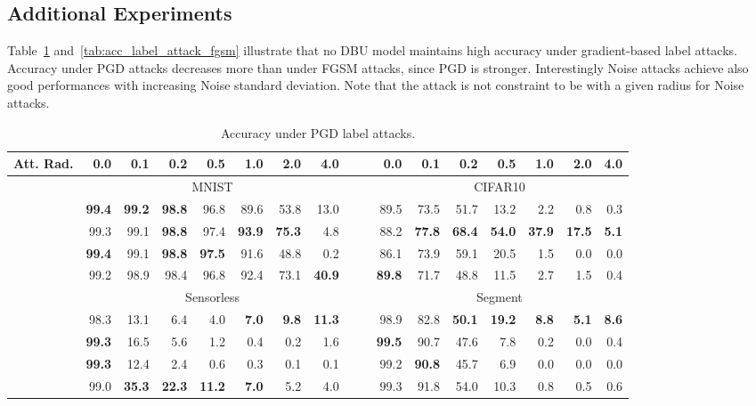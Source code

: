 \newpage 
\subsection{Additional Experiments}



Table~\ref{tab:acc_label_attack} and~\ref{tab:acc_label_attack_fgsm} illustrate that no DBU model maintains high accuracy under gradient-based label attacks. Accuracy under PGD attacks decreases more than under FGSM attacks, since PGD is stronger.  Interestingly Noise attacks achieve also good performances with increasing Noise standard deviation. Note that the attack is not constraint to be with a given radius for Noise attacks.



\begin{table}[htbp!]
 	\centering
 	\caption{Accuracy under PGD label attacks.}
 	\begin{small}
 		\begin{tabular}{@{}rrrrrrrrc|crrrrrrr@{}}
 			\toprule
  			Att. Rad. & 0.0 & 0.1 & 0.2 & 0.5 & 1.0 & 2.0 & 4.0 & & & 0.0 & 0.1 & 0.2 & 0.5 & 1.0 & 2.0 & 4.0 \\
 			\midrule
 			& \multicolumn{7}{c}{MNIST} & & & \multicolumn{7}{c}{CIFAR10} \\
 			\PostNet  &  \bf{99.4} &  \bf{99.2} &  \bf{98.8} &  96.8 &  89.6 &  53.8 &  13.0 & &
 			          &  89.5 &  73.5 &  51.7 &  13.2 &   2.2 &   0.8 &  0.3 \\
 			\PriorNet &  99.3 &  99.1 &  \bf{98.8} &  97.4 &  \bf{93.9} &  \bf{75.3} &   4.8 & &
 			          &  88.2 &  \bf{77.8} &  \bf{68.4} &  \bf{54.0} &  \bf{37.9} &  \bf{17.5} &  \bf{5.1} \\
 		    \DDNet    &  \bf{99.4} &  99.1 &  \bf{98.8} &  \bf{97.5} &  91.6 &  48.8 &   0.2 & &
 		              &  86.1 &  73.9 &  59.1 &  20.5 &   1.5 &   0.0 &  0.0 \\
 		    \EvNet    &  99.2 &  98.9 &  98.4 &  96.8 &  92.4 &  73.1 &  \bf{40.9} & &
 		              &  \bf{89.8} &  71.7 &  48.8 &  11.5 &   2.7 &   1.5 &  0.4 \\
 		    \midrule
 		 & \multicolumn{7}{c}{Sensorless} & & & \multicolumn{7}{c}{Segment} \\
 			\PostNet  &  98.3 &  13.1 &   6.4 &   4.0 &  \bf{7.0} &  \bf{9.8} &  \bf{11.3} & &
 			          &  98.9 &  82.8 &  \bf{50.1} &  \bf{19.2} &  \bf{8.8} &  \bf{5.1} &  \bf{8.6}   \\
 			\PriorNet &  \bf{99.3} &  16.5 &   5.6 &   1.2 &  0.4 &  0.2 &   1.6 & &
 			          &  \bf{99.5} &  90.7 &  47.6 &   7.8 &  0.2 &  0.0 &  0.4 \\
 		    \DDNet    &  \bf{99.3} &  12.4 &   2.4 &   0.6 &  0.3 &  0.1 &   0.1 & &
 		              &  99.2 &  \bf{90.8} &  45.7 &   6.9 &  0.0 &  0.0 &  0.0 \\
 		    \EvNet    &  99.0 &  \bf{35.3} &  \bf{22.3} &  \bf{11.2} &  \bf{7.0} &  5.2 &   4.0 & &
 		              &  99.3 &  91.8 &  54.0 &  10.3 &  0.8 &  0.5 &  0.6 \\
 			\bottomrule
 		\end{tabular}
 	\end{small}
 	\label{tab:acc_label_attack}
\end{table}
